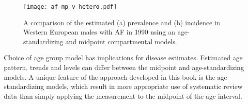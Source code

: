     \begin{figure}[h]
        \begin{center}
            \texttt{[image: af-mp\_v\_hetero.pdf]}
            \caption{A comparison of the estimated (a) prevalence and (b) incidence
              in Western European males with AF in 1990
              using an age-standardizing and midpoint compartmental models.}
            \label{fig:app-af compare}
        \end{center}
    \end{figure}

Choice of age group model has implications for disease estimates.
Estimated age pattern, trends and levels can differ between the
midpoint and age-standardizing models.  A unique feature of the
approach developed in this book is the age-standardizing models, which
result in more appropriate use of systematic review data than simply
applying the measurement to the midpoint of the age interval.
